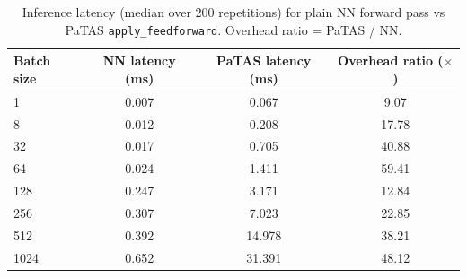 \begin{table}[ht]
\centering
\caption{Inference latency (median over 200 repetitions) for plain NN forward pass vs PaTAS \texttt{apply\_feedforward}. Overhead ratio = PaTAS / NN.}
\label{tab:latency-inference}
\begin{tabular}{lccc}
\toprule
Batch size & NN latency (ms) & PaTAS latency (ms) & Overhead ratio ($\times$) \\
\midrule
1 & 0.007 & 0.067 & 9.07 \\
8 & 0.012 & 0.208 & 17.78 \\
32 & 0.017 & 0.705 & 40.88 \\
64 & 0.024 & 1.411 & 59.41 \\
128 & 0.247 & 3.171 & 12.84 \\
256 & 0.307 & 7.023 & 22.85 \\
512 & 0.392 & 14.978 & 38.21 \\
1024 & 0.652 & 31.391 & 48.12 \\
\bottomrule
\end{tabular}
\end{table}